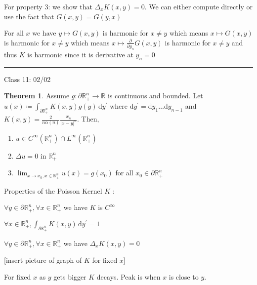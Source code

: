 \documentclass{article}
\theoremstyle{definition}
\newtheorem{theorem}{Theorem}
\begin{document}
For property 3: we show that \(\Delta _x K(x,y)=0\). We can either compute directly or use the fact that \(G(x,y)=G(y,x)\)

For all \(x\) we have \(y \mapsto G(x,y)\) is harmonic for \(x \neq y\) which means \(x \mapsto G(x,y)\) is harmonic for \(x \neq y\) which means \(x \mapsto \frac{\partial }{\partial y_n} G(x,y)\) is harmonic for \(x\neq y\) and thus \(K\) is harmonic since it is derivative at \(y_n=0\) 

\hfil
\hrule

Class 11: 02/02

\begin{theorem}
    Assume \(g : \partial \mathbb{R} ^n_+ \to \mathbb{R} \) is continuous and bounded. Let \(u(x)\coloneqq \int_{\partial \mathbb{R} ^n_+}^{} K(x,y)g(y) \,\mathrm{d}y^{\prime}  \) where \(\mathrm{d} y^{\prime} = \mathrm{d} y_1 \dots \mathrm{d} y_{n-1}\) and \(K(x,y)=\frac{2}{n \alpha (n)} \frac{x_n}{\vert x-y \vert ^n}\). Then,

    \begin{enumerate}
        \item \(u \in C^{\infty}(\mathbb{R} _+^n)\cap L^{\infty}(\mathbb{R} ^n_+)\) 
        \item \(\Delta u = 0\) in \(\mathbb{R} ^n_+\) 
        \item \(\lim_{x \to x_0,x\in \mathbb{R}^n_+} u(x)=g(x_0)\) for all \(x_0\in \partial \mathbb{R} ^n_+\) 
    \end{enumerate}

\end{theorem}

Properties of the Poisson Kernel \(K\) :

\(\forall y\in \partial \mathbb{R}^n_+,\forall x\in \mathbb{R} ^n_+\) we have \(K\) is \(C^{\infty}\) 

\(\forall x\in \mathbb{R} ^n_+, \int_{\partial \mathbb{R} ^n_+}^{} K(x,y) \,\mathrm{d}y^{\prime} =1 \) 

\(\forall y\in \partial \mathbb{R} ^n_+,\forall x\in \mathbb{R} ^n_+\) we have \(\Delta _x K(x,y)=0\) 

[insert picture of graph of \(K\) for fixed \(x\)]

For fixed \(x\) as \(y\) gets bigger \(K\) decays. Peak is when \(x\) is close to \(y\).
\end{document}
